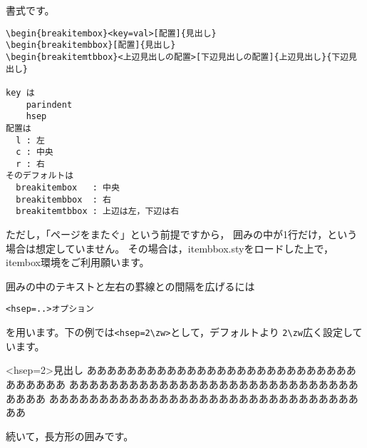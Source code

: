 \documentclass{jarticle}
\begin{document}
書式です。

\begin{boxnote}
\begin{verbatim}
\begin{breakitembox}<key=val>[配置]{見出し}
\begin{breakitembbox}[配置]{見出し}
\begin{breakitemtbbox}<上辺見出しの配置>[下辺見出しの配置]{上辺見出し}{下辺見出し}

key は
    parindent
    hsep
配置は
  l : 左
  c : 中央
  r : 右
そのデフォルトは
  breakitembox   : 中央
  breakitembbox  : 右
  breakitemtbbox : 上辺は左，下辺は右
\end{verbatim}
\end{boxnote}

ただし，「ページをまたぐ」という前提ですから，
囲みの中が1行だけ，という場合は想定していません。
その場合は，\textsf{itembbox.sty}をロードした上で，
\textsf{itembox}環境をご利用願います。
\bigskip

囲みの中のテキストと左右の罫線との間隔を広げるには
\begin{jquote}
\begin{verbatim}
<hsep=..>オプション
\end{verbatim}
\end{jquote}
を用います。下の例では\verb+<hsep=2\zw>+として，デフォルトより
\verb+2\zw+広く設定しています。

\begin{breakitembox}<hsep=2\zw>{見出し}
あああああああああああああああああああああああああああああああああ
あああああああああああああああああああああああああああああああああ
あああああああああああああああああああああああああああああああああ
\end{breakitembox}
\clearpage

続いて，長方形の囲みです。
\end{document}

